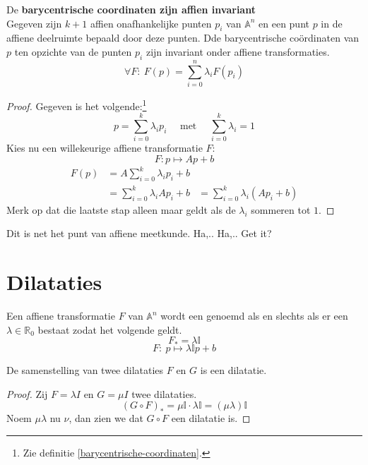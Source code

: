 \documentclass[main.tex]{subfiles}
\begin{document}
\begin{st}
  \label{st:barycentrische-coordinaten-affien-invariant}
  De \textbf{barycentrische coordinaten zijn affien invariant}\\
  Gegeven zijn $k+1$ affien onafhankelijke punten $p_{i}$ van $\mathbb{A}^{n}$ en een punt $p$ in de affiene deelruimte bepaald door deze punten.
  Dde barycentrische co\"ordinaten van $p$ ten opzichte van de punten $p_{i}$ zijn invariant onder affiene transformaties.
  \[ \forall F:\ F(p) = \sum_{i=0}^{n}\lambda_{i}F(p_{i}) \]
  \begin{proof}
    Gegeven is het volgende:\footnote{Zie definitie \ref{barycentrische-coordinaten}.}
    \[ p = \sum_{i=0}^{k}\lambda_{i}p_{i} \quad\text{ met }\quad \sum_{i=0}^{k}\lambda_{i} = 1 \]
    Kies nu een willekeurige affiene transformatie $F$:
    \[ F: p\mapsto Ap + b \]
    \[
    \begin{array}{rll}
      F(p) &= A\sum_{i=0}^{k}\lambda_{i}p_{i} + b &\\
      &= \sum_{i=0}^{k}\lambda_{i}Ap_{i} + b &= \sum_{i=0}^{k}\lambda_{i}(Ap_{i} + b) 
    \end{array}
    \]
    Merk op dat die laatste stap alleen maar geldt als de $\lambda_{i}$ sommeren tot $1$.
  \end{proof}
\end{st}

\begin{opm}
  Dit is net het punt van affiene meetkunde. Ha,.. Ha,.. Get it?
\end{opm}

\section{Dilataties}
\label{sec:dilataties}

\begin{de}
  Een affiene transformatie $F$ van $\mathbb{A}^{n}$ wordt een  genoemd als en slechts als er een $\lambda\in \mathbb{R}_{0}$ bestaat zodat het volgende geldt.
  \[ F_{*} = \lambda  \mathbb{I} \]
  \[ F:\ p \mapsto \lambda \mathbb{I} p + b \]
\end{de}

\begin{st}
  \label{st:samenstelling-dilataties-dilatatie}
  De samenstelling van twee dilataties $F$ en $G$ is een dilatatie.
  
  \begin{proof}
    Zij $F=\lambda I$ en $G= \mu I$ twee dilataties.
    \[ (G \circ F)_{*} = \mu \mathbb{I}  \cdot \lambda \mathbb{I} = (\mu\lambda) \mathbb{I} \]
    Noem $\mu\lambda$ nu $\nu$, dan zien we dat $G \circ F$ een dilatatie is.
  \end{proof}
\end{st}
\end{document}
